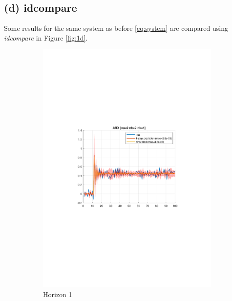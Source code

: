 \documentclass[]{article}
\begin{document}
\subsection{(d) idcompare}
Some results for the same system as before \eqref{eq:system} are compared using \emph{idcompare} in Figure \ref{fig:1d}.
\begin{figure}[ht]
\centering
\begin{subfigure}{.30\textwidth}
	\centering
	\includegraphics[trim= 10cm 8cm 10cm 8cm, scale=0.3]{figures/1d-horizon_1.pdf}
	\caption{Horizon 1}
	\label{fig:1d-horizon1}
\end{subfigure}
\begin{subfigure}{.30\textwidth}
	\centering

\end{subfigure}
\end{figure}
\end{document}
